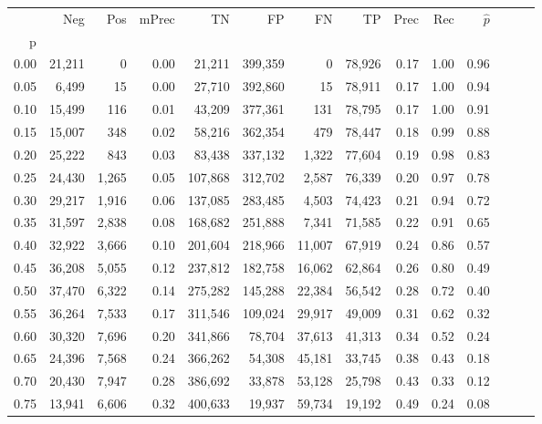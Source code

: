 \begin{tabular}{rrrrrrrrrrrrrr}
\toprule
{} &     Neg &    Pos & mPrec &       TN &       FP &      FN &      TP &  Prec &   Rec & $\hat{p}$ \\
p    &         &        &       &          &          &         &         &       &       &           \\
\midrule
0.00 &  21,211 &      0 &  0.00 &   21,211 &  399,359 &       0 &  78,926 &  0.17 &  1.00 &      0.96 \\
0.05 &   6,499 &     15 &  0.00 &   27,710 &  392,860 &      15 &  78,911 &  0.17 &  1.00 &      0.94 \\
0.10 &  15,499 &    116 &  0.01 &   43,209 &  377,361 &     131 &  78,795 &  0.17 &  1.00 &      0.91 \\
0.15 &  15,007 &    348 &  0.02 &   58,216 &  362,354 &     479 &  78,447 &  0.18 &  0.99 &      0.88 \\
0.20 &  25,222 &    843 &  0.03 &   83,438 &  337,132 &   1,322 &  77,604 &  0.19 &  0.98 &      0.83 \\
0.25 &  24,430 &  1,265 &  0.05 &  107,868 &  312,702 &   2,587 &  76,339 &  0.20 &  0.97 &      0.78 \\
0.30 &  29,217 &  1,916 &  0.06 &  137,085 &  283,485 &   4,503 &  74,423 &  0.21 &  0.94 &      0.72 \\
0.35 &  31,597 &  2,838 &  0.08 &  168,682 &  251,888 &   7,341 &  71,585 &  0.22 &  0.91 &      0.65 \\
0.40 &  32,922 &  3,666 &  0.10 &  201,604 &  218,966 &  11,007 &  67,919 &  0.24 &  0.86 &      0.57 \\
0.45 &  36,208 &  5,055 &  0.12 &  237,812 &  182,758 &  16,062 &  62,864 &  0.26 &  0.80 &      0.49 \\
0.50 &  37,470 &  6,322 &  0.14 &  275,282 &  145,288 &  22,384 &  56,542 &  0.28 &  0.72 &      0.40 \\
0.55 &  36,264 &  7,533 &  0.17 &  311,546 &  109,024 &  29,917 &  49,009 &  0.31 &  0.62 &      0.32 \\
0.60 &  30,320 &  7,696 &  0.20 &  341,866 &   78,704 &  37,613 &  41,313 &  0.34 &  0.52 &      0.24 \\
0.65 &  24,396 &  7,568 &  0.24 &  366,262 &   54,308 &  45,181 &  33,745 &  0.38 &  0.43 &      0.18 \\
0.70 &  20,430 &  7,947 &  0.28 &  386,692 &   33,878 &  53,128 &  25,798 &  0.43 &  0.33 &      0.12 \\
0.75 &  13,941 &  6,606 &  0.32 &  400,633 &   19,937 &  59,734 &  19,192 &  0.49 &  0.24 &      0.08 \\

\end{tabular}
